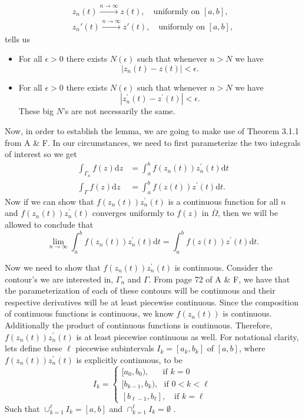 \documentclass[10pt]{amsart}
\newcommand{\D}{\mathrm{d}}
\theoremstyle{nonumberplain}
\begin{document}
\begin{enumerate}[label={\bf {\arabic*}:}]
\begin{itemize}
\begin{align*}
        z_n(t) \overset{n \to \infty}{\longrightarrow} z(t),  \quad \text{
        uniformly on } [a,b],\\
        z_n'(t) \overset{n \to \infty}{\longrightarrow} z'(t), \quad \text{
        uniformly on } [a,b],
      \end{align*}
tells us
\begin{itemize}
\item For all $\epsilon > 0$ there exists $N(\epsilon)$ such that whenever $n > N$ we have $$|z_n(t) - z(t)| < \epsilon.$$
\item For all $\epsilon > 0$ there exists $N(\epsilon)$ such that whenever $n > N$ we have $$|z_n^\prime(t) - z^\prime(t)| < \epsilon.$$
These big $N$'s are not necessarily the same.
\end{itemize}
\end{itemize}
Now, in order to establish the lemma, we are going to make use of Theorem 3.1.1 from A \& F.
In our circumstances, we need to first parameterize the two integrals of interest so we get
\begin{align*}
\int_{\Gamma_n}  f(z) \D z &= \int_a^b  f(z_n(t))z_n^\prime(t) \D t \\
\int_{\Gamma}  f(z) \D z &= \int_a^b  f(z(t))z^\prime(t) \D t.
\end{align*}
Now if we can show that $f(z_n(t))z_n^\prime(t)$ is a continuous function for all $n$ and $f(z_n(t))z_n^\prime(t)$ converges uniformly to $f(z)$ in $\overline \Omega$, then we will be allowed to conclude that
$$
\lim_{n\rightarrow\infty} \int_a^b  f(z_n(t))z_n^\prime(t) \D t = \int_a^b  f(z(t))z^\prime(t) \D t.
$$

\noindent
Now we need to show that $f(z_n(t))z_n^\prime(t)$ is continuous.
Consider the contour's we are interested in, $\Gamma_n$ and $\Gamma$.
From page 72 of A \& F, we have that the parameterization of each of these contours will be continuous and their respective derivatives will be at least piecewise continuous.
Since the composition of continuous functions is continuous, we know $f(z_n(t))$ is continuous.
Additionally the product of continuous functions is continuous.
Therefore, $f(z_n(t))z_n^\prime(t)$ is at least piecewise continuous as well.
For notational clarity, lets define these $\ell$ piecewise subintervals $I_k = [a_k, b_k]$ of $[a,b]$, where $f(z_n(t))z_n^\prime(t)$ is explicitly continuous, to be
$$
I_k = \begin{cases}
[a_0, b_0), \quad \:\:\: \text{if } k = 0 \\
[b_{k - 1}, b_k), \:\:\: \text{if } 0 < k < \ell \\
[b_{\ell - 1}, b_\ell], \quad \text{if } k = \ell
\end{cases}
$$
Such that $\cup_{k=1}^\ell I_k = [a, b]$ and $\cap_{k=1}^\ell I_k = \emptyset$ .
\\


\end{enumerate}
\end{document}
